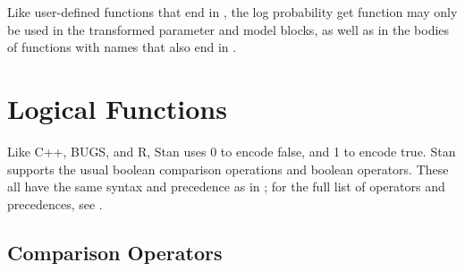 Like user-defined functions that end in , the log
probability get function may only be used in the transformed parameter
and model blocks, as well as in the bodies of functions with names
that also end in .


\section{Logical Functions}

Like C++, BUGS, and R, Stan uses 0 to encode false, and 1 to encode
true.  Stan supports the usual boolean comparison operations and
boolean operators.  These all have the same syntax and precedence as
in \Cpp; for the full list of operators and precedences, see
.  

\subsection{Comparison Operators}


